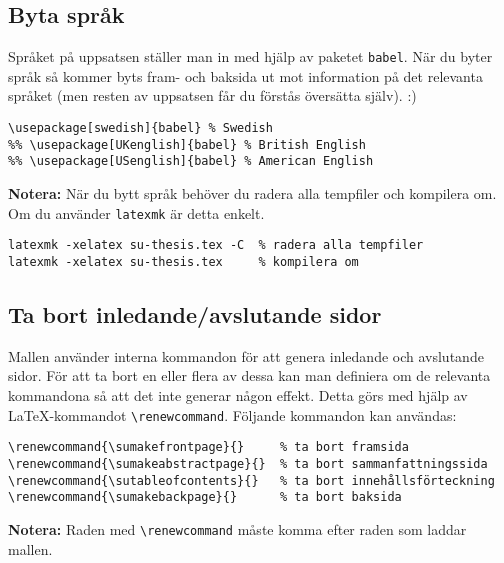 \subsection{Byta språk}
\label{sprak}

\noindent Språket på uppsatsen ställer man in med hjälp av paketet
\texttt{babel}. När du byter språk så kommer byts fram- och baksida ut mot
information på det relevanta språket (men resten av uppsatsen får du förstås
översätta själv). :)

\begin{verbatim}
\usepackage[swedish]{babel} % Swedish
%% \usepackage[UKenglish]{babel} % British English
%% \usepackage[USenglish]{babel} % American English
\end{verbatim}

\noindent\textbf{Notera:} När du bytt språk behöver du radera alla tempfiler
och kompilera om. Om du använder \texttt{latexmk} är detta enkelt.

\begin{verbatim}
latexmk -xelatex su-thesis.tex -C  % radera alla tempfiler
latexmk -xelatex su-thesis.tex     % kompilera om
\end{verbatim}


\subsection{Ta bort inledande/avslutande sidor}
\label{genererade}

Mallen använder interna kommandon för att genera inledande och avslutande
sidor. För att ta bort en eller flera av dessa kan man definiera om de
relevanta kommandona så att det inte generar någon effekt. Detta görs med hjälp
av \LaTeX-kommandot \verb|\renewcommand|. Följande kommandon kan användas:

\begin{verbatim}
\renewcommand{\sumakefrontpage}{}     % ta bort framsida
\renewcommand{\sumakeabstractpage}{}  % ta bort sammanfattningssida
\renewcommand{\sutableofcontents}{}   % ta bort innehållsförteckning
\renewcommand{\sumakebackpage}{}      % ta bort baksida
\end{verbatim}

\noindent\textbf{Notera:} Raden med \verb|\renewcommand| måste komma efter
raden som laddar mallen.

